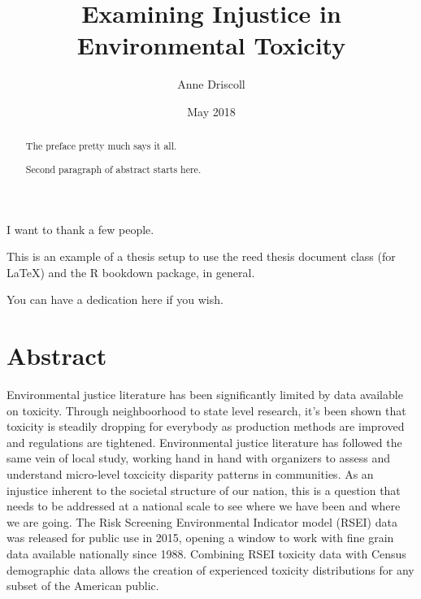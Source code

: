 \documentclass[12pt,twoside]{dukestatscithesis}
\title{Examining Injustice in Environmental Toxicity}
\author{Anne Driscoll}
\date{May 2018}
\theoremstyle{definition}
\theoremstyle{definition}
\theoremstyle{definition}
\theoremstyle{remark}
\begin{document}
  \maketitle

\frontmatter %
\pagestyle{empty} %
  \begin{acknowledgements}
    I want to thank a few people.
  \end{acknowledgements}
  \begin{preface}
    This is an example of a thesis setup to use the reed thesis document
    class (for LaTeX) and the R bookdown package, in general.
  \end{preface}
  \hypersetup{linkcolor=black}
  \setcounter{tocdepth}{2}
  \tableofcontents

  \listoftables

  \listoffigures
  \begin{abstract}
    The preface pretty much says it all. \par
    
    Second paragraph of abstract starts here.
  \end{abstract}
  \begin{dedication}
    You can have a dedication here if you wish.
  \end{dedication}
\mainmatter %
\pagestyle{fancyplain} %

\chapter*{Abstract}\label{abstract}

Environmental justice literature has been significantly limited by data
available on toxicity. Through neighboorhood to state level research,
it's been shown that toxicity is steadily dropping for everybody as
production methods are improved and regulations are tightened.
Environmental justice literature has followed the same vein of local
study, working hand in hand with organizers to assess and understand
micro-level toxcicity disparity patterns in communities. As an injustice
inherent to the societal structure of our nation, this is a question
that needs to be addressed at a national scale to see where we have been
and where we are going. The Risk Screening Environmental Indicator model
(RSEI) data was released for public use in 2015, opening a window to
work with fine grain data available nationally since 1988. Combining
RSEI toxicity data with Census demographic data allows the creation of
experienced toxicity distributions for any subset of the American
public.
\end{document}
